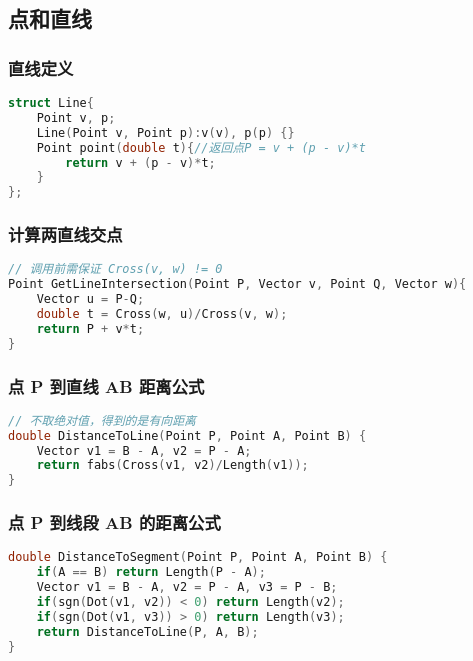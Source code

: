 \subsection{点和直线}

\subsubsection{直线定义}

\begin{lstlisting}[language=C++]
struct Line{
    Point v, p;
    Line(Point v, Point p):v(v), p(p) {}
    Point point(double t){//返回点P = v + (p - v)*t
        return v + (p - v)*t;
    }
};
\end{lstlisting}

\subsubsection{计算两直线交点}

\begin{lstlisting}[language=C++]
// 调用前需保证 Cross(v, w) != 0
Point GetLineIntersection(Point P, Vector v, Point Q, Vector w){
    Vector u = P-Q;
    double t = Cross(w, u)/Cross(v, w);
    return P + v*t;
}
\end{lstlisting}

\subsubsection{点 P 到直线 AB 距离公式}

\begin{lstlisting}[language=C++]
// 不取绝对值，得到的是有向距离
double DistanceToLine(Point P, Point A, Point B) {
    Vector v1 = B - A, v2 = P - A;
    return fabs(Cross(v1, v2)/Length(v1));
}
\end{lstlisting}

\subsubsection{点 P 到线段 AB 的距离公式}

\begin{lstlisting}[language=C++]
double DistanceToSegment(Point P, Point A, Point B) {
    if(A == B) return Length(P - A);
    Vector v1 = B - A, v2 = P - A, v3 = P - B;
    if(sgn(Dot(v1, v2)) < 0) return Length(v2);
    if(sgn(Dot(v1, v3)) > 0) return Length(v3);
    return DistanceToLine(P, A, B);
}
\end{lstlisting}

